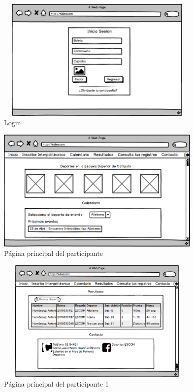		\begin{figure}[hbt!]
			\centering
			\includegraphics[width=10cm, height=6cm]{Imagenes/Disenos/p1Login.png}
			\caption{Login}
			\label{Login}
		\end{figure}
	
		\begin{figure}[hbt!]
			\centering
			\includegraphics[width=10cm, height=6cm]{Imagenes/Disenos/p13Iniciopaticipante.png}
			\caption{Página principal del participante}
			\label{Inicioparticipante}
		\end{figure}	
	
		\begin{figure}[hbt!]
			\centering
			\includegraphics[width=10cm, height=6cm]{Imagenes/Disenos/p14Iniciopaticipante1.png}
			\caption{Página principal del participante 1}
			\label{Inicioparticipante1}
		\end{figure}
			\pagebreak
	
